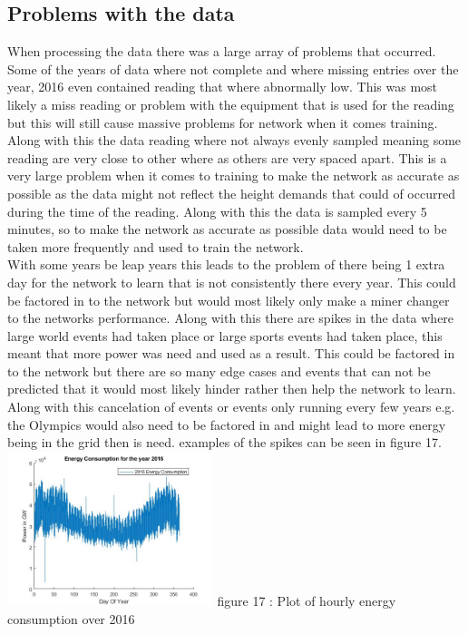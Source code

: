 \documentclass{IEEEtran}[11pt]
\begin{document}
\subsection{Problems with the data}
\begin{flushleft}
  When processing the data there was a large array of problems that occurred.
  Some of the years of data where not complete and where missing entries over
  the year, 2016 even contained reading that where abnormally low. This was most
  likely a miss reading or problem with the equipment that is used for the
  reading but this will still cause massive problems for network when it
  comes training. Along with this the data reading where not always evenly sampled
  meaning some reading are very close to other where as others are very spaced apart.
  This is a very large problem when it comes to training to make the network as
  accurate as possible as the data might not reflect the height demands that
  could of occurred during the time of the reading. Along with this the data is
  sampled every 5 minutes, so to make the network as accurate as possible data
  would need to be taken more frequently and used to train the network.
  \\
  \vspace{1.5mm}
  With some years be leap years this leads to the problem of there being 1
  extra day for the network to learn that is not consistently there every year.
  This could be factored in to the network but would most likely only make a
  miner changer to the networks performance. Along with this there are spikes in
  the data where large world events had taken place or large sports events had
  taken place, this meant that more power was need and used as a result.
  This could be factored in to the network but there are so many edge cases and
  events that can not be predicted that it would most likely hinder rather then
  help the network to learn. Along with this cancelation of events or events only
  running every few years e.g. the Olympics would also need to be factored in
  and might lead to more energy being in the grid then is need. examples of the
  spikes can be seen in figure 17.
  \vspace{1.5mm}
  \includegraphics[width = 0.45\textwidth]{2016datasetplotted}
  \vspace{1.5mm}
  {\footnotesize figure 17 : Plot of hourly energy consumption over 2016}
  \\
  \vspace{1.5mm}

\end{flushleft}
\end{document}
